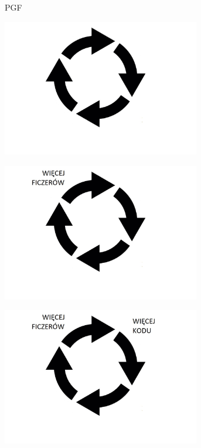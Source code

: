 \documentclass{beamer}
\begin{document}
\begin{frame}{}
\begin{center}
\Huge{PGF}
\end{center}
\end{frame}

\begin{frame}{}
\begin{center}
  	\includegraphics[height=6cm]{pgf1.jpg}
\end{center}
\end{frame}

\begin{frame}{}
\begin{center}
  	\includegraphics[height=6cm]{pgf2.jpg}
\end{center}
\end{frame}

\begin{frame}{}
\begin{center}
  	\includegraphics[height=6cm]{pgf3.jpg}
\end{center}
\end{frame}
\end{document}
